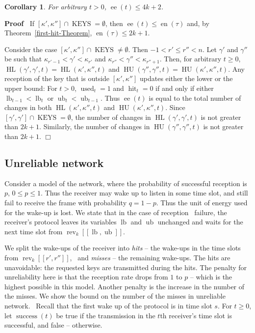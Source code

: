 \documentclass{article}
\newcommand{\tmem}[1]{{\em #1\/}}
\newcommand{\tmop}[1]{\ensuremath{\operatorname{#1}}}
\newenvironment{proof}{\noindent\textbf{Proof\ }}{\hspace*{\fill}$\Box$\medskip}
\newtheorem{corollary}{Corollary}
\begin{document}
\begin{corollary}
  \label{Corollary-ee}For arbitrary $t > 0$, $\tmop{ee} (t) \leq 4 k + 2$.
\end{corollary}

\begin{proof}
 If $[\kappa', \kappa''] \cap \tmop{KEYS} =
  \emptyset$, then $\tmop{ee} (t) \leq \tmop{en} (\tau)$ and, by
  Theorem~\ref{first-hit-Theorem}, $\tmop{en} (\tau) \leq 2 k + 1$.
  
  Consider the case $[\kappa', \kappa''] \cap \tmop{KEYS} \not=  \emptyset$.
  Then $- 1 < r' \leq r'' < n$. Let $\gamma'$ and $\gamma''$ be such that
  $\kappa_{r' - 1} < \gamma' < \kappa_{r'}$ and $\kappa_{r''} < \gamma'' <
  \kappa_{r'' + 1}$. Then, for arbitrary $t \geq 0$, $\tmop{HL} (\gamma',
  \gamma', t) = \tmop{HL} (\kappa', \kappa'', t)$ and $\tmop{HU} (\gamma'',
  \gamma'', t) = \tmop{HU} (\kappa', \kappa'', t)$. Any reception of the key
  that is outside $[\kappa', \kappa'']$ updates either the lower or the upper
  bound: For $t > 0$, $\tmop{used}_t = 1$ and $\tmop{hit}_t = 0$ if and only
  if either $\tmop{lb}_{t - 1} < \tmop{lb}_t$ or $\tmop{ub}_t < \tmop{ub}_{t -
  1}$. Thus $\tmop{ee} (t)$ is equal to the total number of changes in both
  $\tmop{HL} (\kappa', \kappa'', t)$ and $\tmop{HU} (\kappa', \kappa'', t)$.
  Since $[\gamma', \gamma'] \cap \tmop{KEYS} = \emptyset$, the number of
  changes in $\tmop{HL} (\gamma', \gamma', t)$ is not greater than $2 k + 1$.
  Similarly, the number of changes in $\tmop{HU} (\gamma'', \gamma'', t)$ is
  not greater than $2 k + 1$.
\end{proof}

\subsection{\label{Section-unreliable}Unreliable network}

Consider a model of the network, where the probability of successful reception
is $p$, $0 \leq p \leq 1$. Thus the receiver may wake up to listen in some
time slot, and still fail to receive the frame with probability $q = 1 - p$.
Thus the unit of energy used for the wake-up is lost. We state that in the
case of reception \ failure, the receiver's protocol leaves its variables
$\tmop{lb}$ and $\tmop{ub}$ unchanged and waits for the next time slot from
$\tmop{rev}_k [[\tmop{lb}, \tmop{ub}]]$.

We split the wake-ups of the receiver into {\tmem{hits}} -- the wake-ups in
the time slots from $\tmop{rev}_k [[r', r'']]$, \ and {\tmem{misses}} -- the
remaining wake-ups. The hits are unavoidable: the requested keys are
transmitted during the hits. The penalty for unreliability here is that the
reception rate drops from $1$ to $p$ -- which is the highest possible in this
model. Another penalty is the increase in the number of the misses. We
show the bound on the number of the misses in unreliable network. \ Recall
that the first wake up of the protocol is in time slot $s$. For $t \geq 0$,
let $\tmop{success} (t)$ be true if the transmission in the $t$th receiver's
time slot is successful, and false -- otherwise.
\end{document}
